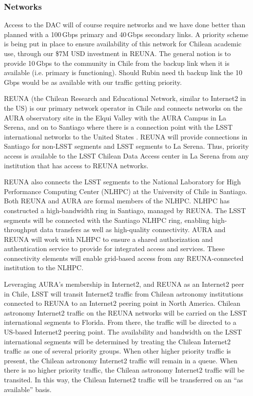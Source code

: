 \subsubsection{Networks}

Access to the DAC will of course require networks and we have done better than planned with a 100\,Gbps primary and 40\,Gbps secondary links.
A priority scheme is being put in place to ensure availability of this network  for Chilean academic use, through our \$7M USD investment in REUNA.
The general notion is to provide 10\,Gbps to the community in Chile from the backup link when it is available (i.e. primary is functioning).
Should Rubin need th backup link the 10\,Gbps would be as available with our traffic getting priority.

REUNA (the Chilean Research and Educational Network, similar to Internet2 in the US) is our primary network operator in Chile and connects networks on the AURA observatory site in the Elqui Valley with the AURA Campus in La Serena, and on to Santiago where there is a connection point with the LSST international networks to the United States .
REUNA will provide connections in Santiago for non-LSST segments and LSST segments to La Serena.
Thus, priority access is available to the LSST Chilean Data Access center in La Serena from any institution that has access to REUNA networks.

REUNA also connects the LSST segments to the National Laboratory for High Performance Computing Center (NLHPC) at the University of Chile in Santiago.
Both REUNA and AURA are formal members of the NLHPC.
NLHPC has constructed a high-bandwidth ring in Santiago, managed by REUNA.
The LSST segments will be connected with the Santiago NLHPC ring, enabling high-throughput data transfers as well as high-quality connectivity.
AURA and REUNA will work with NLHPC to ensure a shared authorization and authentication service to provide for integrated access and services.
These connectivity elements will enable grid-based access from any REUNA-connected institution to the NLHPC.

Leveraging AURA’s membership in Internet2, and REUNA as an Internet2 peer in Chile, LSST will transit Internet2 traffic from Chilean astronomy institutions connected to REUNA to an Internet2 peering point in North America.
Chilean astronomy Internet2 traffic on the REUNA networks will be carried on the LSST international segments to Florida.
From there, the traffic will be directed to a US-based Internet2 peering point.
The availability and bandwidth on the LSST international segments will be determined by treating the Chilean Internet2 traffic as one of several priority groups.
When other higher priority traffic is present, the Chilean astronomy Internet2 traffic will remain in a queue.
When there is no higher priority traffic, the Chilean astronomy Internet2 traffic will be transited.
In this way, the Chilean Internet2 traffic will be transferred on an ``as available'' basis.


